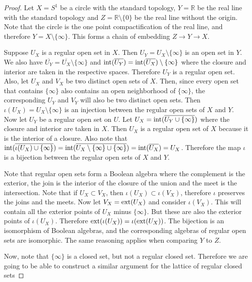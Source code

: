 \begin{proof}
	Let $X=S^1$ be a circle with the standard topology, $Y=\mathbb{R}$ be the real line with the standard topology and $Z=\mathbb{R}\setminus \{0\}$ be the real line without the origin. Note that the circle is the one point compactification of the real line, and therefore $Y=X\setminus \{\infty\}$. This forms a chain of embedding $Z \to Y \to X$.
	
	Suppose $U_X$ is a regular open set in $X$. Then $U_Y = U_X \setminus \{\infty\}$ is an open set in $Y$. We also have $\overline{U_Y} = \overline{U_X} \setminus \{\infty\}$ and $\operatorname{int}(\overline{U_Y}) = \operatorname{int}(\overline{U_X}) \setminus \{\infty\}$ where the closure and interior are taken in the respective spaces. Therefore $U_Y$ is a regular open set. Also, let $U_X$ and $V_X$ be two distinct open sets of $X$. Then, since every open set that contains $\{\infty\}$ also contains an open neighborhood of $\{\infty\}$, the corresponding $U_Y$ and $V_Y$ will also be two distinct open sets. Then $\iota(U_X) = U_X \setminus \{\infty\}$ is an injection between the regular open sets of $X$ and $Y$. Now let $U_Y$ be a regular open set on $U$. Let $U_X = \operatorname{int}(\overline{U_Y \cup \{ \infty \}})$ where the  closure and interior are taken in $X$. Then $U_X$ is a regular open set of $X$ because it is the interior of a closure. Also note that $\operatorname{int}(\overline{\iota(U_X) \cup \{ \infty \}}) = \operatorname{int}(\overline{U_X \setminus \{\infty\} \cup \{ \infty \}}) = \operatorname{int}(\overline{U_X}) = U_X$. Therefore the map $\iota$ is a bijection between the regular open sets of $X$ and $Y$.
	
	Note that regular open sets form a Boolean algebra where the complement is the exterior, the join is the interior of the closure of the union and the meet is the intersection. Note that if $U_X \subset V_X$, then $\iota(U_X) \subset \iota(V_X)$, therefore $\iota$ preserves the joins and the meets. Now let $V_X = \operatorname{ext}(U_X)$ and consider $\iota(V_X)$. This will contain all the exterior points of $U_X$ minus $\{\infty\}$. But these are also the exterior points of $\iota(U_X)$. Therefore $\operatorname{ext}(\iota(U_X)) = \iota(\operatorname{ext}(U_X))$. The bijection is an isomorphism of Boolean algebras, and the corresponding algebras of regular open sets are isomorphic. The same reasoning applies when comparing $Y$ to $Z$.
	
	Now, note that $\{\infty\}$ is a closed set, but not a regular closed set. Therefore we are going to be able to construct a similar argument for the lattice of regular closed sets
\end{proof}

